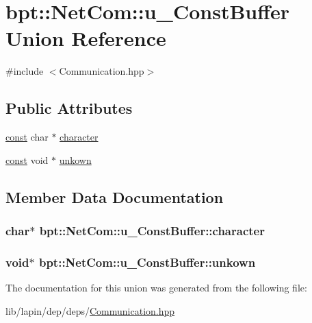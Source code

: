 \hypertarget{unionbpt_1_1_net_com_1_1u___const_buffer}{\section{bpt\-:\-:Net\-Com\-:\-:u\-\_\-\-Const\-Buffer Union Reference}
\label{unionbpt_1_1_net_com_1_1u___const_buffer}
}


{\ttfamily \#include $<$Communication.\-hpp$>$}

\subsection*{Public Attributes}
\begin{DoxyCompactItemize}
\item 
\hyperlink{term__entry_8h_a57bd63ce7f9a353488880e3de6692d5a}{const} char $\ast$ \hyperlink{unionbpt_1_1_net_com_1_1u___const_buffer_aaacfa13fbee08321a22cd5556e8552a4}{character}
\item 
\hyperlink{term__entry_8h_a57bd63ce7f9a353488880e3de6692d5a}{const} void $\ast$ \hyperlink{unionbpt_1_1_net_com_1_1u___const_buffer_a342aaee6a28ae779563d5eaf1e0d7ab4}{unkown}
\end{DoxyCompactItemize}


\subsection{Member Data Documentation}
\hypertarget{unionbpt_1_1_net_com_1_1u___const_buffer_aaacfa13fbee08321a22cd5556e8552a4}{
\subsubsection[{character}]{ char$\ast$ bpt\-::\-Net\-Com\-::u\-\_\-\-Const\-Buffer\-::character}}\label{unionbpt_1_1_net_com_1_1u___const_buffer_aaacfa13fbee08321a22cd5556e8552a4}
\hypertarget{unionbpt_1_1_net_com_1_1u___const_buffer_a342aaee6a28ae779563d5eaf1e0d7ab4}{
\subsubsection[{unkown}]{ void$\ast$ bpt\-::\-Net\-Com\-::u\-\_\-\-Const\-Buffer\-::unkown}}\label{unionbpt_1_1_net_com_1_1u___const_buffer_a342aaee6a28ae779563d5eaf1e0d7ab4}


The documentation for this union was generated from the following file\-:\begin{DoxyCompactItemize}
\item 
lib/lapin/dep/deps/\hyperlink{_communication_8hpp}{Communication.\-hpp}\end{DoxyCompactItemize}
